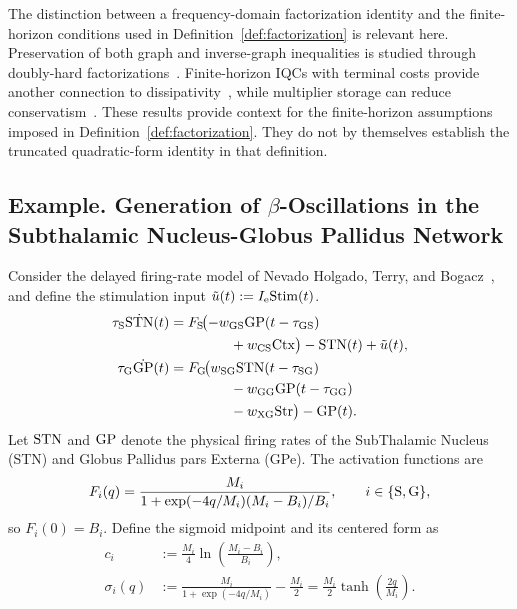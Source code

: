 The distinction between a frequency-domain factorization identity and the
finite-horizon conditions used in Definition~\ref{def:factorization} is relevant
here. Preservation of both graph and inverse-graph inequalities is studied
through doubly-hard factorizations~\cite{carrasco2018equivalence}.
Finite-horizon IQCs with terminal costs provide another connection to
dissipativity~\cite{scherer2018dynamicdissipation}, while multiplier storage
can reduce conservatism~\cite{magicalhiddenenergy,hu}.
These results provide context for the finite-horizon assumptions imposed in
Definition~\ref{def:factorization}. They do not by themselves establish the
truncated quadratic-form identity in that definition.


\subsection{Example. Generation of \texorpdfstring{$\beta$}{beta}-Oscillations in the Subthalamic Nucleus-Globus Pallidus Network}
Consider the delayed firing-rate model of Nevado Holgado, Terry, and
Bogacz~\cite[Eq.~(5)]{nevadoHolgado2010betaOscillations}, and define the
stimulation input $\tilde u(t):=I_{{\mathrm{e}}}{\mathrm{Stim}}(t)$.
\begin{equation}
      \begin{aligned}
      \tau_{{\mathrm{S}}} \dot{{\mathrm{STN}}}(t)
          ={}&F_{{\mathrm{S}}}\!\bigl(-w_{{\mathrm{GS}}}{\mathrm{GP}}
              (t-\tau_{{\mathrm{GS}}})\\
             &\qquad\quad +w_{{\mathrm{CS}}}{\mathrm{Ctx}}\bigr)
              -{\mathrm{STN}}(t)+\tilde u(t),\\
      \tau_{{\mathrm{G}}} \dot{{\mathrm{GP}}}(t)
          ={}&F_{{\mathrm{G}}}\!\bigl(w_{{\mathrm{SG}}}{\mathrm{STN}}
              (t-\tau_{{\mathrm{SG}}})\\
             &\qquad\quad-w_{{\mathrm{GG}}}{\mathrm{GP}}(t-\tau_{{\mathrm{GG}}})\\
             &\qquad\quad-w_{{\mathrm{XG}}}{\mathrm{Str}}\bigr)-{\mathrm{GP}}(t).
      \end{aligned}
\end{equation}
Let ${\mathrm{STN}}$ and
${\mathrm{GP}}$ denote the physical firing rates of the SubThalamic Nucleus
(STN) and Globus Pallidus pars Externa (GPe). The activation functions are
\begin{equation}\label{eq:stn-gpe-uncentered-sigmoid}
F_i(q)=\frac{M_i}{1+\exp(-4q/M_i)(M_i-B_i)/B_i},
\qquad i\in\{{\mathrm{S}},{\mathrm{G}}\},
\end{equation}
so $F_i(0)=B_i$. Define the sigmoid midpoint and its centered form as
\begin{equation}\label{eq:stn-gpe-centered-sigmoid}
\begin{aligned}
c_i&:=\frac{M_i}{4}\ln\!\left(\frac{M_i-B_i}{B_i}\right),\\
\sigma_i(q)&:=\frac{M_i}{1+\exp(-4q/M_i)}-\frac{M_i}{2}=\frac{M_i}{2}\tanh\!\left(\frac{2q}{M_i}\right).
\end{aligned}
\end{equation}
